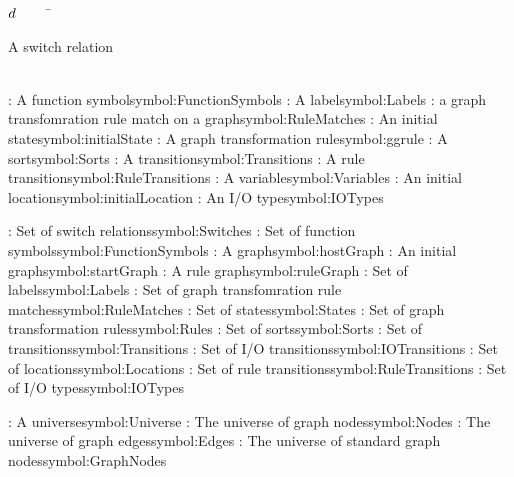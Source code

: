 \begin{tabbing}

$d$~~~~~\=\parbox{5in}{A switch relation\dotfill \pageref{symbol:Switches}}\\
\addsymbol \functionSymbol: {A function symbol}{symbol:FunctionSymbols}
\addsymbol \ltsLabel: {A label}{symbol:Labels}
\addsymbol {}: {a graph transfomration rule match on a graph}{symbol:RuleMatches}
\addsymbol \initialState: {An initial state}{symbol:initialState}
\addsymbol \ggrule: {A graph transformation rule}{symbol:ggrule}
\addsymbol \sort: {A sort}{symbol:Sorts}
\addsymbol \transition: {A transition}{symbol:Transitions}
\addsymbol {}: {A rule transition}{symbol:RuleTransitions}
\addsymbol \variable: {A variable}{symbol:Variables}
\addsymbol \initialLocation: {An initial location}{symbol:initialLocation}
\addsymbol \iotype: {An I/O type}{symbol:IOTypes}

\addsymbol \Switches: {Set of switch relations}{symbol:Switches}
\addsymbol \FunctionSymbols: {Set of function symbols}{symbol:FunctionSymbols}
\addsymbol \hostGraph: {A graph}{symbol:hostGraph}
\addsymbol \startGraph: {An initial graph}{symbol:startGraph}
\addsymbol {}: {A rule graph}{symbol:ruleGraph}
\addsymbol \Labels: {Set of labels}{symbol:Labels}
\addsymbol \RuleMatches: {Set of graph transfomration rule matches}{symbol:RuleMatches}
\addsymbol \States: {Set of states}{symbol:States}
\addsymbol \Rules: {Set of graph transformation rules}{symbol:Rules}
\addsymbol \Sorts: {Set of sorts}{symbol:Sorts}
\addsymbol \Transitions: {Set of transitions}{symbol:Transitions}
\addsymbol \IOTransitions: {Set of I/O transitions}{symbol:IOTransitions}
\addsymbol \Locations: {Set of locations}{symbol:Locations}
\addsymbol \RuleTransitions: {Set of rule transitions}{symbol:RuleTransitions}
\addsymbol \IOTypes: {Set of I/O types}{symbol:IOTypes}

\addsymbol {}: {A universe}{symbol:Universe}
\addsymbol \Nodes: {The universe of graph nodes}{symbol:Nodes}
\addsymbol \Edges: {The universe of graph edges}{symbol:Edges}
\addsymbol \GraphNodes: {The universe of standard graph nodes}{symbol:GraphNodes}


\end{tabbing}
